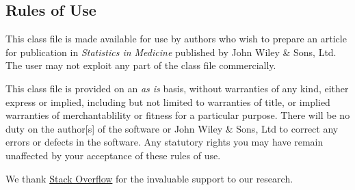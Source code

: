 \documentclass[times,]{simauth}
\begin{document}
\subsection{Rules of Use}\label{rules-of-use}

This class file is made available for use by authors who wish to prepare
an article for publication in \emph{Statistics in Medicine} published by
John Wiley \& Sons, Ltd. The user may not exploit any part of the class
file commercially.

This class file is provided on an \emph{as is} basis, without warranties
of any kind, either express or implied, including but not limited to
warranties of title, or implied warranties of merchantablility or
fitness for a particular purpose. There will be no duty on the
author{[}s{]} of the software or John Wiley \& Sons, Ltd to correct any
errors or defects in the software. Any statutory rights you may have
remain unaffected by your acceptance of these rules of use.

\acks We thank \href{https://stackoverflow.com/}{Stack Overflow} for the
invaluable support to our research.



\end{document}
